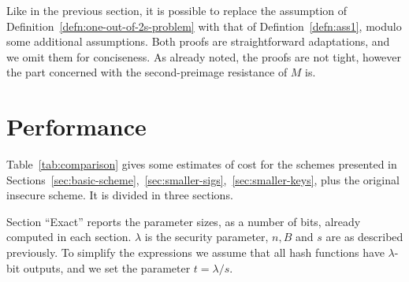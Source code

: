 \documentclass{llncs}
\begin{document}
Like in the previous section, it is possible to replace the assumption of Definition~\ref{defn:one-out-of-2s-problem} with that of Defintion~\ref{defn:ass1}, modulo some additional assumptions.
Both proofs are straightforward adaptations, and we omit them for conciseness.
As already noted, the proofs are not tight, however the part concerned with the second-preimage resistance of $M$ is.


\section{Performance}


Table~\ref{tab:comparison} gives some estimates of cost for the schemes presented in Sections~\ref{sec:basic-scheme},~\ref{sec:smaller-sigs},~\ref{sec:smaller-keys}, plus the original insecure scheme.
It is divided in three sections.

Section ``Exact'' reports the parameter sizes, as a number of bits, already computed in each section.
$\lambda$ is the security parameter, $n,B$ and $s$ are as described previously.
To simplify the expressions we assume that all hash functions have $\lambda$-bit outputs, and we set the parameter $t=\lambda/s$.
\end{document}
